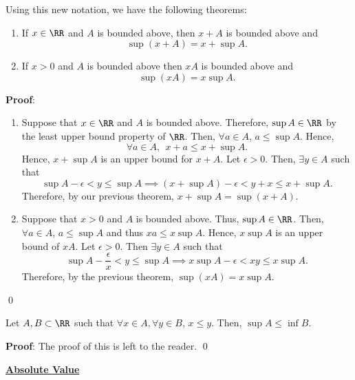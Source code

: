 \begin{theorem}
Using this new notation, we have the following theorems:
\begin{enumerate}
    \item If $x\in\RR$ and $A$ is bounded above, then $x+A$ is bounded above and 
    \[
    \sup(x+A) = x+\sup A.
    \]
    \item If $x>0$ and $A$ is bounded above then $xA$ is bounded above and 
    \[
    \sup(xA) = x\sup A.
    \]
\end{enumerate}
\end{theorem}
\textbf{Proof}: 
\begin{enumerate}
    \item Suppose that $x\in \RR$ and $A$ is bounded above. Therefore, $\sup A \in \RR$ by the least upper bound property of $\RR$. Then, $\forall a\in A$, $a\leq \sup A.$ Hence,
    \[
    \forall a\in A, ~~ x+a\leq x+\sup A. 
    \]
    Hence, $x+\sup A$ is an upper bound for $x+A$. Let $\epsilon>0$. Then, $\exists y\in A$ such that 
    \[
    \sup A - \epsilon < y \leq \sup A\implies (x+\sup A) -\epsilon < y+x \leq x+\sup A.
    \]
    Therefore, by our previous theorem, $x+\sup A = \sup(x+A)$.
    
    \item Suppose that $x>0$ and $A$ is bounded above. Thus, $\sup A\in \RR$. Then, $\forall a\in A$, $a\leq \sup A$ and thus $xa\leq x\sup A$. Hence, $x\sup A$ is an upper bound of $xA$. Let $\epsilon>0$. Then $\exists y\in A$ such that 
    \[
    \sup A -\frac{\epsilon}{x}< y\leq \sup A \implies x\sup A - \epsilon < xy \leq x\sup A.
    \]
    Therefore, by the previous theorem, $\sup(xA) = x\sup A$.
\end{enumerate}
\qed 

\begin{theorem}
Let $A,B\subset \RR$ such that $\forall x\in A,\forall y\in B$, $x\leq y$. Then, $\sup A \leq \inf B$. 
\end{theorem}
\textbf{Proof}: The proof of this is left to the reader. \qed

\noindent \underline{\textbf{Absolute Value}}

